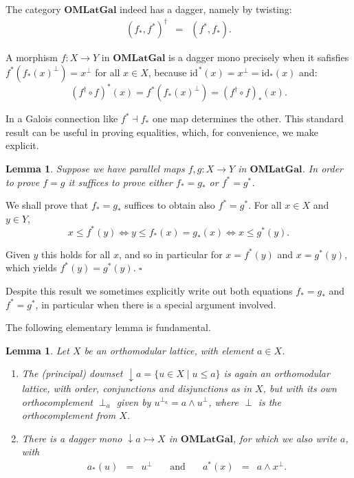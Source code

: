 \documentclass{article}
\newtheorem{lemma}[theorem]{Lemma}
\newenvironment{proof}[1][Proof]{ \begin{trivlist}\item[\hskip \labelsep {\bfseries #1}]}{ \end{trivlist}}
\newcommand{\QEDbox}{\square}
\newcommand{\QED}{\hspace*{\fill}$\QEDbox$}
\newcommand{\after}{\mathrel{\circ}}
\newcommand{\Cat}[1]{\ensuremath{\mathbf{#1}}}
\newcommand{\idmap}[1][]{\ensuremath{\mathrm{id}_{#1}}}
\newcommand{\id}[1][]{\idmap[#1]}
\newcommand{\setin}[3]{\{#1\in#2\;|\;#3\}}
\newcommand{\conjun}{\mathrel{\wedge}}
\newcommand{\downset}{\mathop{\downarrow}\!}
\begin{document}
The category $\Cat{OMLatGal}$ indeed has a dagger, namely by twisting:
$$\begin{array}{rcl}
(f_*,f^*)^{\dag}
& = &
(f^*,f_*).
\end{array}$$

\noindent A morphism $f\colon X \rightarrow Y$ in \Cat{OMLatGal} is a
dagger mono precisely when it safisfies $f^*(f_*(x)^\perp)=x^\perp$
for all $x \in X$, because $\id^*(x) = x^\perp = \id[*](x)$ and:
$$  (f^\dag \after f)^*(x) = f^*(f_*(x)^\perp) = (f^\dag \after f)_*(x).$$


In a Galois connection like $f^{*} \dashv f_{*}$ one map determines
the other. This standard result can be useful in proving equalities,
which, for convenience, we make explicit.


\begin{lemma}
\label{MapEqLem}
Suppose we have parallel maps $f,g\colon X\rightarrow Y$ in
\Cat{OMLatGal}. In order to prove $f=g$ it suffices to prove either
$f_{*} = g_{*}$ or $f^{*}=g^{*}$.
\end{lemma}


\begin{proof}
We shall prove that $f_{*} = g_{*}$ suffices to obtain also 
$f^{*}=g^{*}$. For all $x\in X$ and $y\in Y$,
$$x\leq f^{*}(y) \Longleftrightarrow
y \leq f_{*}(x) = g_{*}(x) \Longleftrightarrow
x \leq g^{*}(y).$$

\noindent Given $y$ this holds for all $x$, and so in particular for
$x = f^{*}(y)$ and $x=g^{*}(y)$, which yields $f^{*}(y) =
g^{*}(y)$. \QED
\end{proof}


Despite this result we sometimes explicitly write out both equations
$f_{*}=g_{*}$ and $f^{*}=g^{*}$, in particular when there is a special
argument involved.

The following elementary lemma is fundamental.


\begin{lemma}
\label{DownsetLem}
Let $X$ be an orthomodular lattice, with element $a\in X$. 
\begin{enumerate}
\item The (principal) downset $\downset a = \setin{u}{X}{u \leq a}$ is
  again an orthomodular lattice, with order, conjunctions and
  disjunctions as in $X$, but with its own orthocomplement $\perp_a$ given
  by $u^{\perp_a} = a \conjun u^{\perp}$, where $\perp$ is the
  orthocomplement from $X$.

\item There is a dagger mono $\downset a \rightarrowtail X$ in
  \Cat{OMLatGal}, for which we also write $a$, with
$$\begin{array}{rclcrcl}
a_{*}(u) & = & u^{\perp}
& \quad\mbox{and}\quad &
a^{*}(x) & = & a \conjun x^{\perp}.
\end{array}$$
\end{enumerate}
\end{lemma}
\end{document}
